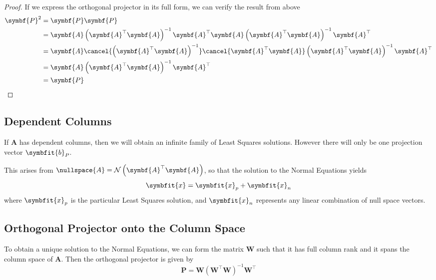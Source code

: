 \documentclass{article}
\begin{document}
\begin{proof}
    If we express the orthogonal projector in its full form, we can verify the result from above
    \begin{align*}
        \symbf{P}^2 & = \symbf{P} \symbf{P}                                                                                                                                           \\
                    & = \symbf{A} \left( \symbf{A}^\top \symbf{A} \right)^{-1} \symbf{A}^\top \symbf{A} \left( \symbf{A}^\top \symbf{A} \right)^{-1} \symbf{A}^\top                   \\
                    & = \symbf{A} \cancel{\left( \symbf{A}^\top \symbf{A} \right)^{-1}} \cancel{\symbf{A}^\top \symbf{A}} \left( \symbf{A}^\top \symbf{A} \right)^{-1} \symbf{A}^\top \\
                    & = \symbf{A} \left( \symbf{A}^\top \symbf{A} \right)^{-1} \symbf{A}^\top                                                                                         \\
                    & = \symbf{P}
    \end{align*}
\end{proof}
\subsection{Dependent Columns}
If \(\symbf{A}\) has dependent columns, then we will obtain an infinite family of Least
Squares solutions. However there will only be one projection vector \(\symbfit{b}_P\).

This arises from \(\nullspace{A} = \mathcal{N}\left(\symbf{A}^\top \symbf{A}\right)\), so that
the solution to the Normal Equations yields
\begin{equation*}
    \symbfit{x} = \symbfit{x}_p + \symbfit{x}_n
\end{equation*}
where \(\symbfit{x}_p\) is the particular Least Squares solution, and \(\symbfit{x}_n\) represents
any linear combination of null space vectors.
\subsection{Orthogonal Projector onto the Column Space}
To obtain a unique solution to the Normal Equations, we can form the matrix \(\symbf{W}\)
such that it has full column rank and it spans the column space of \(\symbf{A}\).
Then the orthogonal projector is given by
\begin{equation*}
    \symbf{P} = \symbf{W} \left( \symbf{W}^\top \symbf{W} \right)^{-1} \symbf{W}^\top
\end{equation*}
\end{document}
